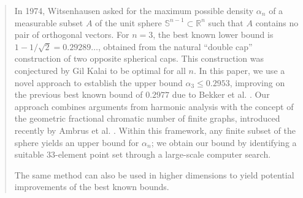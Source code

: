 \documentclass[11pt]{amsart}
\numberwithin{equation}{section}
\newcommand{\R}{\mathbb R}
\begin{document}
\begin{abstract}

In 1974, Witsenhausen asked for the maximum possible density $\alpha_n$ of a measurable subset $A$ of the unit sphere $\mathbb{S}^{n-1}\subset \mathbb{R}^n$ such that $A$ contains no pair of orthogonal vectors. For $n=3$, the best known lower bound is $1 - 1/\sqrt{2} = 0.29289\dots$, obtained from the natural ``double cap'' construction of two opposite spherical caps. This construction was conjectured by Gil Kalai \cite{kalai} to be optimal for all $n$. In this paper, we use a novel approach to establish the upper bound $\alpha_3\le 0.2953$, improving on the previous best known bound of $0.2977$ due to Bekker et al. \cite{bekker}. Our approach combines arguments from harmonic analysis with the concept of the geometric fractional chromatic number of finite graphs, introduced recently by Ambrus et al. \cite{ambrus}. Within this framework, any finite subset of the sphere yields an upper bound for $\alpha_n$; we obtain our bound by identifying a suitable 33-element point set through a large-scale computer search.

The same method can also be used in higher dimensions to yield potential improvements of the best known bounds. 
\end{abstract}

\end{document}

